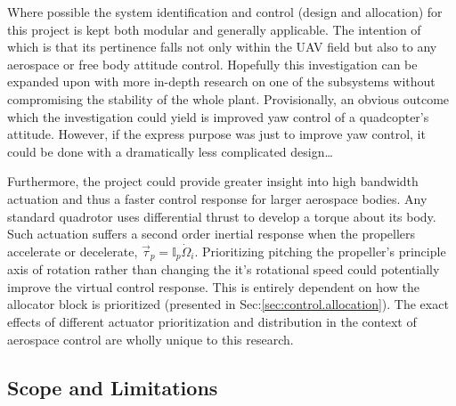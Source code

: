 \par
Where possible the system identification and control (design and allocation) for this project is kept both modular and generally applicable. The intention of which is that its pertinence falls not only within the UAV field but also to any aerospace or free body attitude control. Hopefully this investigation can be expanded upon with more in-depth research on one of the subsystems without compromising the stability of the whole plant. Provisionally, an obvious outcome which the investigation could yield is improved yaw control of a quadcopter's attitude. However, if the express purpose was just to improve yaw control, it could be done with a dramatically less complicated design\ldots
\par
Furthermore, the project could provide greater insight into high bandwidth actuation and thus a faster control response for larger aerospace bodies. Any standard quadrotor uses differential thrust to develop a torque about its body. Such actuation suffers a second order inertial response when the propellers accelerate or decelerate, $\vec{\tau}_{p}=\mathbb{I}_p\dot{\Omega}_i$. Prioritizing pitching the propeller's principle axis of rotation rather than changing the it's rotational speed could potentially improve the virtual control response. This is entirely dependent on how the allocator block is prioritized (presented in Sec:\ref{sec:control.allocation}). The exact effects of different actuator prioritization and distribution in the context of aerospace control are wholly unique to this research.
\subsection{Scope and Limitations}
\label{subsec:intro.foreword.scopeandlim}
